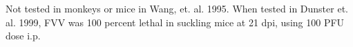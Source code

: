\documentclass{report}
\begin{document}
\begin{table}[h]
	\centering
	\caption{Origin of the strains used in the study.}
		\begin{ThreePartTable}

		
		\begin{tablenotes}
			\item[a]Not tested in monkeys or mice in Wang, et. al. 1995. When tested in Dunster et. al. 1999, FVV was 100 percent
			lethal in suckling mice at 21 dpi, using 100 PFU dose i.p. 
			
		\end{tablenotes}
		\end{ThreePartTable}
		\label{my-label}
\end{table}
\end{document}
